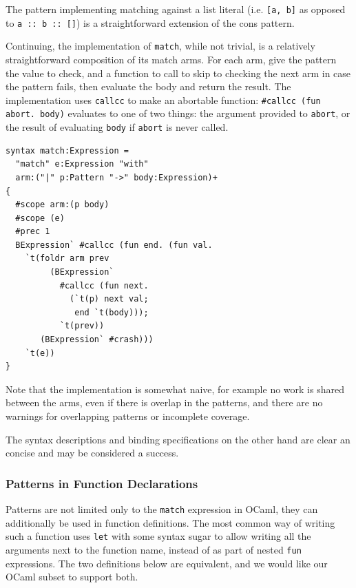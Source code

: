 \documentclass{kththesis}
\begin{document}
The pattern implementing matching against a list literal (i.e. \texttt{[a, b]} as opposed to \texttt{a :: b :: []}) is a straightforward extension of the cons pattern.

Continuing, the implementation of \texttt{match}, while not trivial, is a relatively straightforward composition of its match arms. For each arm, give the pattern the value to check, and a function to call to skip to checking the next arm in case the pattern fails, then evaluate the body and return the result. The implementation uses \texttt{callcc} to make an abortable function: \texttt{#callcc (fun abort. body)} evaluates to one of two things: the argument provided to \texttt{abort}, or the result of evaluating \texttt{body} if \texttt{abort} is never called.

\begin{verbatim}
syntax match:Expression =
  "match" e:Expression "with"
  arm:("|" p:Pattern "->" body:Expression)+
{
  #scope arm:(p body)
  #scope (e)
  #prec 1
  BExpression` #callcc (fun end. (fun val.
    `t(foldr arm prev
         (BExpression`
           #callcc (fun next.
             (`t(p) next val;
              end `t(body)));
           `t(prev))
       (BExpression` #crash)))
    `t(e))
}
\end{verbatim}

Note that the implementation is somewhat naive, for example no work is shared between the arms, even if there is overlap in the patterns, and there are no warnings for overlapping patterns or incomplete coverage.

The syntax descriptions and binding specifications on the other hand are clear an concise and may be considered a success.

\subsubsection{Patterns in Function Declarations}
\label{sec:ocaml-function-argument-patterns}

Patterns are not limited only to the \texttt{match} expression in OCaml, they can additionally be used in function definitions. The most common way of writing such a function uses \texttt{let} with some syntax sugar to allow writing all the arguments next to the function name, instead of as part of nested \texttt{fun} expressions. The two definitions below are equivalent, and we would like our OCaml subset to support both.
\end{document}
